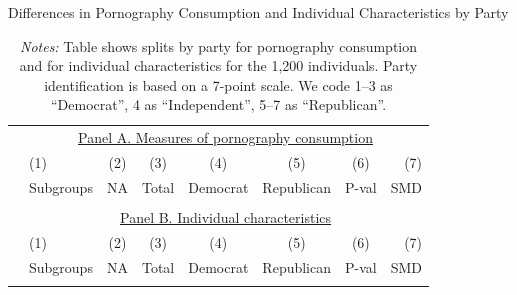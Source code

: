 \documentclass[12pt, letterpaper]{article}
\begin{document}
\begin{table}[ht] \centering \small \setlength\tabcolsep{5 pt}
	\caption{Differences in Pornography Consumption and Individual Characteristics by Party}
	\label{tab:characteristics_split_by_party}
	\begin{adjustbox}{max width=\textwidth}
		\begin{tabular}{@{\hspace{0\tabcolsep}}llrcccrr@{\hspace{0\tabcolsep}}}
			\toprule
			&\multicolumn{7}{c}{\underline{Panel A. Measures of pornography consumption}}\\
			&\multicolumn{1}{l}{(1)}&\multicolumn{1}{c}{(2)}&\multicolumn{1}{c}{(3)}&\multicolumn{1}{c}{(4)}&\multicolumn{1}{c}{(5)}&\multicolumn{1}{c}{(6)}&\multicolumn{1}{r}{(7)}\\			
			&\multicolumn{1}{l}{Subgroups}&\multicolumn{1}{c}{NA}&\multicolumn{1}{c}{Total}&\multicolumn{1}{c}{Democrat}&\multicolumn{1}{c}{Republican}&\multicolumn{1}{c}{P-val}&\multicolumn{1}{r}{SMD}\\
			\cmidrule{2-8}
			\\
			\cmidrule{2-8}
			&\multicolumn{7}{c}{\underline{Panel B. Individual characteristics}}\\
			&\multicolumn{1}{l}{(1)}&\multicolumn{1}{c}{(2)}&\multicolumn{1}{c}{(3)}&\multicolumn{1}{c}{(4)}&\multicolumn{1}{c}{(5)}&\multicolumn{1}{c}{(6)}&\multicolumn{1}{r}{(7)}\\			
			&\multicolumn{1}{l}{Subgroups}&\multicolumn{1}{c}{NA}&\multicolumn{1}{c}{Total}&\multicolumn{1}{c}{Democrat}&\multicolumn{1}{c}{Republican}&\multicolumn{1}{c}{P-val}&\multicolumn{1}{r}{SMD}\\
			\cmidrule{2-8}
			\\
			\bottomrule
		\end{tabular}
	\end{adjustbox}
	\caption*{\scriptsize \emph{Notes:}
		Table shows splits by party for pornography consumption and for individual characteristics for the 1,200 individuals.
		Party identification is based on a 7-point scale. We code 1--3 as ``Democrat'', 4 as ``Independent'', 5--7 as ``Republican''.
}
\end{table}
\end{document}
